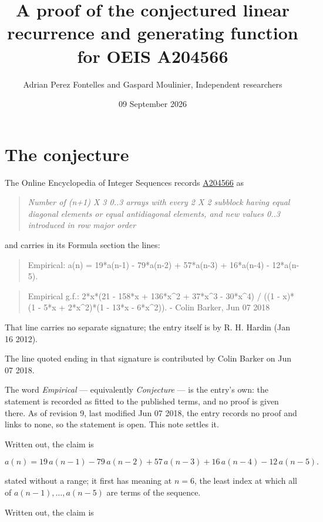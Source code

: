 \documentclass[11pt]{article}
\title{A proof of the conjectured linear recurrence and generating function for OEIS A204566}
\author{Adrian Perez Fontelles and Gaspard Moulinier, Independent researchers}
\date{09 September 2026}
\theoremstyle{definition}
\begin{document}
\maketitle
\section{The conjecture}

The Online Encyclopedia of Integer Sequences records \href{https://oeis.org/A204566}{A204566} as

\begin{quote}\itshape Number of (n+1) X 3 0..3 arrays with every 2 X 2 subblock having equal diagonal elements or equal antidiagonal elements, and new values 0..3 introduced in row major order\end{quote}

and carries in its Formula section the lines:

\begin{quote}\ttfamily Empirical: a(n) = 19*a(n-1) - 79*a(n-2) + 57*a(n-3) + 16*a(n-4) - 12*a(n-5).\end{quote}

\begin{quote}\ttfamily Empirical g.f.: 2*x*(21 - 158*x + 136*x\textasciicircum{}2 + 37*x\textasciicircum{}3 - 30*x\textasciicircum{}4) / ((1 - x)*(1 - 5*x + 2*x\textasciicircum{}2)*(1 - 13*x - 6*x\textasciicircum{}2)). - Colin Barker, Jun 07 2018\end{quote}

That line carries no separate signature; the entry itself is by R. H. Hardin (Jan 16 2012).

The line quoted ending in that signature is contributed by Colin Barker on Jun 07 2018.

The word {\itshape Empirical} --- equivalently {\itshape Conjecture} --- is the entry's own: the statement is recorded as fitted to the published terms, and no proof is given there. As of revision 9, last modified Jun 07 2018, the entry records no proof and links to none, so the statement is open. This note settles it.

Written out, the claim is

\[a(n) = 19\,a(n-1) - 79\,a(n-2) + 57\,a(n-3) + 16\,a(n-4) - 12\,a(n-5).\]

stated without a range; it first has meaning at $n = 6$, the least index at which all of $a(n-1),\dots,a(n-5)$ are terms of the sequence.

Written out, the claim is
\end{document}
